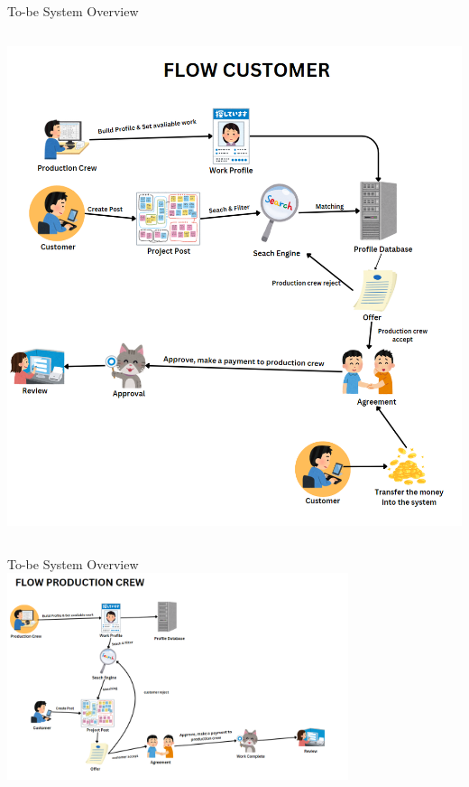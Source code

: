 \documentclass[aspectratio=169]{beamer}
\begin{document}
\begin{frame}{To-be System Overview}
\begin{columns}
        \begin{column}{0.4\textwidth}
            \centering
            \includegraphics[width=\textwidth]{flowcustomer.png}
        \end{column}

    \end{columns}

\end{frame}

\begin{frame}{To-be System Overview}
    \centering
    \includegraphics[width=0.75\textwidth]{flowerproductioncrew.png}
\end{frame}
\end{document}
